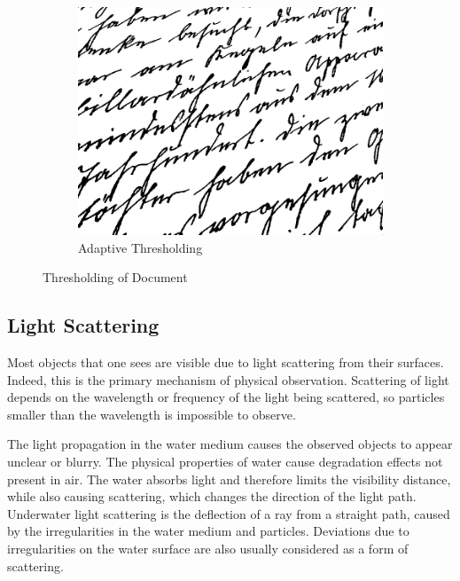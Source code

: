 \begin{figure}[H]
\begin{subfigure}{.33\textwidth}
        \centering
        \includegraphics[width=.99\linewidth]{images/literature/thresholding/text_adaptive_thresholding}
        \caption{Adaptive Thresholding}
    \end{subfigure}
    \caption{Thresholding of Document}
    \label{fig:text_threshold}
\end{figure}




\subsection{Light Scattering} \label{light_scattering}

Most objects that one sees are visible due to light scattering from their surfaces. Indeed, this is the primary mechanism of physical observation. Scattering of light depends on the wavelength or frequency of the light being scattered, so particles smaller than the wavelength is impossible to observe.\cite{website:wiki_light_scattering}

The light propagation in the water medium causes the observed objects to appear unclear or blurry. The physical properties of water cause degradation effects not present in air. The water absorbs light and therefore limits the visibility distance, while also causing scattering, which changes the direction of the light path. Underwater light scattering is the deflection of a ray from a straight path, caused by the irregularities in the water medium and particles. Deviations due to irregularities on the water surface are also usually considered as a form of scattering. 

